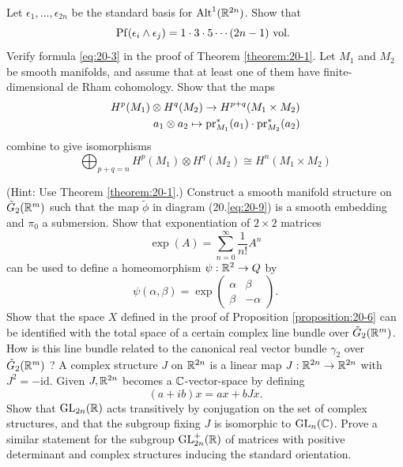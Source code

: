 \begin{enumerate}[\theexercise.1]
\[    \]
  \NewItem Let ${\epsilon }_{1},\ldots,{\epsilon }_{2n}$ be the standard basis for ${\operatorname{Alt}}^{1}( {\mathbb{R}}^{2n})$. Show that
    \[
      \mathrm{Pf}( {{\epsilon }_{i} \land  {\epsilon }_{j}})  = 1 \cdot  3 \cdot  5\cdots ( {{2n}- 1}) \text{ vol. }
    \]
  \newchap[20]
  \NewItem Verify formula \eqref{eq:20-3} in the proof of Theorem \ref{theorem:20-1}.
  \NewItem Let ${M}_{1}$ and ${M}_{2}$ be smooth manifolds, and assume that at least one of them have finite-dimensional de Rham cohomology. Show that the maps
    \[
    \begin{aligned}
      {H}^{p}( {M}_{1})  \otimes H^{q}( {M}_{2})  \rightarrow H^{p + q}( {{M}_{1} \times  {M}_{2}}) \\
      {a}_{1} \otimes  {a}_{2} \mapsto  {\ensuremath{\mathrm{pr}}}_{{M}_{1}}^*( {a}_{1})  \cdot  {\ensuremath{\mathrm{pr}}}_{{M}_{2}}^*( {a}_{2})
    \end{aligned}
    \]
    combine to give isomorphisms
    \[
      \bigoplus_{p + q = n} H^{p}( {M}_{1})  \otimes H^{q}( {M}_{2})  \cong H^{n}( {{M}_{1} \times  {M}_{2}})
    \]
    \par(Hint: Use Theorem \ref{theorem:20-1}.)
  \NewItem Construct a smooth manifold structure on ${\tilde{G}}_{2}({\mathbb{R}}^{m})$ such that the map $\tilde{\phi }$ in diagram (20.\ref{eq:20-9}) is a smooth embedding and ${\pi}_{0}$ a submersion.
  \NewItem Show that exponentiation of $2 \times  2$ matrices
    \[
      \exp ( A)  = \sum_{{n = 0}}^{\infty }\frac{1}{n!}{A}^{n}
    \]
    can be used to define a homeomorphism $\psi  : {\mathbb{R}}^{2} \rightarrow  Q$ by
    \[
      \psi ( {\alpha,\beta })  = \exp \begin{pmatrix} \alpha & \beta \\ \beta & - \alpha  \end{pmatrix}.
    \]
    Show that the space $X$ defined in the proof of Proposition \ref{proposition:20-6} can be identified with the total space of a certain complex line bundle over ${\tilde{G}}_{2}( {\mathbb{R}}^{m})$. How is this line bundle related to the canonical real vector bundle ${\gamma }_{2}$ over ${\tilde{G}}_{2}( {\mathbb{R}}^{m})$ ?
  \NewItem A complex structure $J$ on ${\mathbb{R}}^{2n}$ is a linear map $J : {\mathbb{R}}^{2n} \rightarrow  {\ensuremath{\mathbb{R}}}^{2n}$ with ${J}^{2} = - \mathrm{{id}}$. Given $J,{{\mathbb{R}}}^{2n}$ becomes a $\mathbb{C}$-vector-space by defining
    \[
      ( {a + {ib}}) x = {ax} + {bJx}.
    \]
    Show that ${\mathrm{{GL}}}_{2n}( \mathbb{R})$ acts transitively by conjugation on the set of complex structures, and that the subgroup fixing $J$ is isomorphic to ${\mathrm{{GL}}}_{n}( \mathbb{C})$.
    Prove a similar statement for the subgroup ${\mathrm{{GL}}}_{2n}^{ + }( \mathbb{R})$ of matrices with positive determinant and complex structures inducing the standard orientation.

\end{enumerate}
